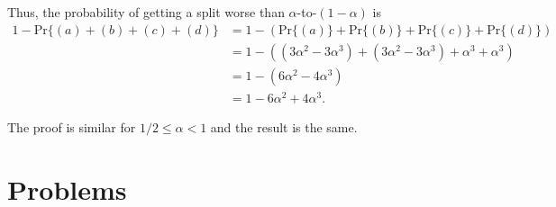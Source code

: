 \begin{enumerate}
\begin{framed}
Thus, the probability of getting a split worse than $\alpha$-to-$(1 - \alpha)$ is
\begin{equation*}
\begin{aligned}
  1 - \text{Pr}\{(a) + (b) + (c) + (d)\}
  &= 1 - \left(\text{Pr}\{(a)\} + \text{Pr}\{(b)\} + \text{Pr}\{(c)\} + \text{Pr}\{(d)\}\right)\\
  &= 1 - \left((3 \alpha^2 - 3 \alpha^3) + (3 \alpha^2 - 3 \alpha^3) + \alpha^3 + \alpha^3\right)\\
  &= 1 - (6 \alpha^2 - 4 \alpha^3)\\
  &= 1 - 6 \alpha^2 + 4 \alpha^3.
\end{aligned}
\end{equation*}

The proof is similar for $1/2 \le \alpha < 1$ and the result is the same.
\end{framed}

\end{enumerate}

\newpage

\section*{Problems}
%

